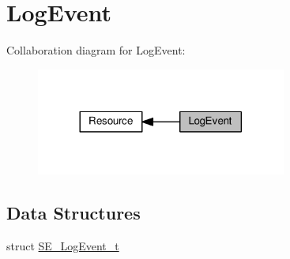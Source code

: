 \hypertarget{group__LogEvent}{}\section{Log\+Event}
\label{group__LogEvent}
Collaboration diagram for Log\+Event\+:\nopagebreak
\begin{figure}[H]
\begin{center}
\leavevmode
\includegraphics[width=233pt]{group__LogEvent}
\end{center}
\end{figure}
\subsection*{Data Structures}
\begin{DoxyCompactItemize}
\item 
struct \hyperlink{structSE__LogEvent__t}{S\+E\+\_\+\+Log\+Event\+\_\+t}
\end{DoxyCompactItemize}
